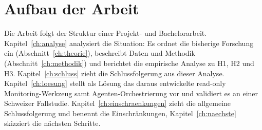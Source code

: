\section{Aufbau der Arbeit}
Die Arbeit folgt der Struktur einer Projekt- und Bachelorarbeit.
Kapitel~\ref{ch:analyse} analysiert die Situation: Es ordnet die bisherige
Forschung ein (Abschnitt~\ref{ch:theorie}), beschreibt Daten und Methodik
(Abschnitt~\ref{ch:methodik}) und berichtet die empirische Analyse zu H1, H2 und
H3. Kapitel~\ref{ch:schluss} zieht die Schlussfolgerung aus dieser Analyse.
Kapitel~\ref{ch:loesung} stellt als Lösung das daraus entwickelte read-only
Monitoring-Werkzeug samt Agenten-Orchestrierung vor und validiert es an einer
Schweizer Fallstudie. Kapitel~\ref{ch:einschraenkungen} zieht die allgemeine
Schlussfolgerung und benennt die Einschränkungen, Kapitel~\ref{ch:naechste}
skizziert die nächsten Schritte.
